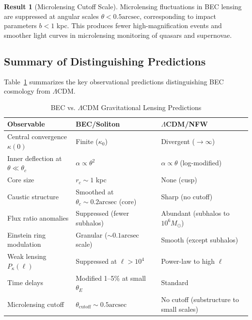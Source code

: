 \documentclass[11pt,a4paper]{article}
\newcommand{\Msun}{\ensuremath{M_\odot}}
\newcommand{\arcsec}{\ensuremath{\text{arcsec}}}
\theoremstyle{definition}
\newtheorem{result}{Result}[section]
\theoremstyle{remark}
\begin{document}
\begin{result}[Microlensing Cutoff Scale]
Microlensing fluctuations in BEC lensing are suppressed at angular scales $\theta < 0.5\arcsec$, corresponding to impact parameters $b < 1$ kpc. This produces fewer high-magnification events and smoother light curves in microlensing monitoring of quasars and supernovae.
\end{result}

\subsection{Summary of Distinguishing Predictions}
\label{sec:predictions_summary}

Table~\ref{tab:predictions} summarizes the key observational predictions distinguishing BEC cosmology from $\Lambda$CDM.

\begin{table}[H]
\centering
\caption{BEC vs. $\Lambda$CDM Gravitational Lensing Predictions}
\label{tab:predictions}
\begin{tabular}{@{}p{4.5cm}p{4.5cm}p{4.5cm}@{}}
\toprule
\textbf{Observable} & \textbf{BEC/Soliton} & \textbf{$\Lambda$CDM/NFW} \\
\midrule
Central convergence $\kappa(0)$ & Finite ($\kappa_0$) & Divergent ($\to \infty$) \\
Inner deflection at $\theta \ll \theta_c$ & $\alpha \propto \theta^2$ & $\alpha \propto \theta$ (log-modified) \\
Core size & $r_c \sim 1$ kpc & None (cusp) \\
Caustic structure & Smoothed at $\theta_c \sim 0.2\arcsec$ (core) & Sharp (no cutoff) \\
Flux ratio anomalies & Suppressed (fewer subhalos) & Abundant (subhalos to $10^6 \Msun$) \\
Einstein ring modulation & Granular ($\sim 0.1\arcsec$ scale) & Smooth (except subhalos) \\
Weak lensing $P_\kappa(\ell)$ & Suppressed at $\ell > 10^4$ & Power-law to high $\ell$ \\
Time delays & Modified 1--5\% at small $\theta_E$ & Standard \\
Microlensing cutoff & $\theta_{\mathrm{cutoff}} \sim 0.5\arcsec$ & No cutoff (substructure to small scales) \\
\bottomrule
\end{tabular}
\end{table}

\end{document}
